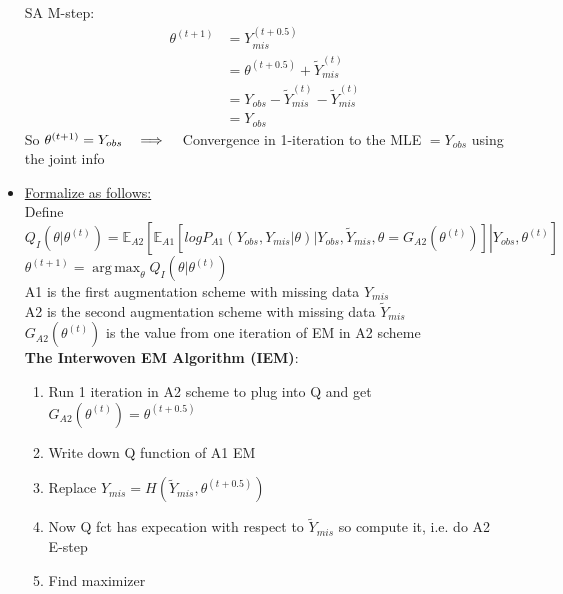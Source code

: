 \documentclass[a4paper, 11pt]{report}
\newcommand{\tab}{\hspace*{1.0em}} %
\newcommand{\imply}{\tab \Longrightarrow \tab}
\newcommand{\yo}{Y_{obs}}
\newcommand{\ym}{Y_{mis}}
\newcommand{\ymf}{Y_{mis}^{(t+0.5)}}
\newcommand{\yt}{\widetilde{Y}_{mis}}
\newcommand{\ytt}{\widetilde{Y}_{mis}^{(t)}}
\newcommand{\tht}{\theta^{(t)}}
\newcommand{\thf}{\theta^{(t+0.5)}}
\newcommand{\tho}{\theta^{(t+1)}}
\begin{document}
\begin{itemize}
		SA M-step:
		\begin{align*}		
			\tho &= \ymf \\ &= \thf + \ytt \\ &= \yo - \ytt - \ytt \\ &= \yo  
		\end{align*}
		So $\tho = \yo \imply $ Convergence in 1-iteration to the MLE $= \yo$ using the joint info 
		
	\item \underline{Formalize as follows:} \\
		Define $Q_I(\theta|\tht) = \mathbb{E}_{A2} \left[ \left. \mathbb{E}_{A1} \left[ log P_{A1}\left(  \yo,\ym | \theta \right) \Big| \yo, \yt, \theta = G_{A2} \left(\tht \right) \right]  \right| \yo, \tht \right]$ \\
		$\tho = \operatorname*{arg\,max}_{\theta}  Q_I \left( \theta | \tht \right)$ \\
		
		A1 is the first augmentation scheme with missing data $\ym$ \\
		A2 is the second augmentation scheme with missing data $\yt$ \\
		$ G_{A2} \left(\tht \right) $ is the value from one iteration of EM in A2 scheme \\
		
		\textbf{The Interwoven EM Algorithm (IEM)}:
		\begin{enumerate}[1)]
			\item Run 1 iteration in A2 scheme to plug into Q and get $ G_{A2} \left(\tht \right) = \thf $
			
			\item Write down Q function of A1 EM
			
			\item Replace $\ym = H(\yt, \thf)$
			
			\item Now Q fct has expecation with respect to $\yt$ so compute it, i.e. do A2 E-step
			
			\item Find maximizer
		
		\end{enumerate}


\end{itemize}
\end{document}

